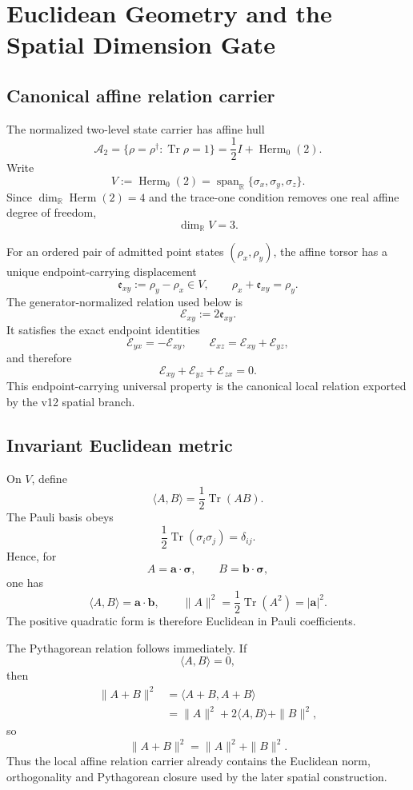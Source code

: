 \chapter{Euclidean Geometry and the Spatial Dimension Gate}
\label{ch:v12_euclidean_dimension}

\section{Canonical affine relation carrier}

The normalized two-level state carrier has affine hull
\[
\mathcal A_2
=
\{\rho=\rho^\dagger:\operatorname{Tr}\rho=1\}
=
\frac12I+\operatorname{Herm}_0(2).
\]
Write
\[
V:=\operatorname{Herm}_0(2)
=
\operatorname{span}_{\mathbb R}\{\sigma_x,\sigma_y,\sigma_z\}.
\]
Since \(\dim_{\mathbb R}\operatorname{Herm}(2)=4\) and the trace-one condition removes one
real affine degree of freedom,
\[
\boxed{\dim_{\mathbb R}V=3.}
\]

For an ordered pair of admitted point states \((\rho_x,\rho_y)\), the affine torsor
has a unique endpoint-carrying displacement
\[
\boxed{\mathfrak e_{xy}:=\rho_y-\rho_x\in V},
\qquad
\rho_x+\mathfrak e_{xy}=\rho_y.
\]
The generator-normalized relation used below is
\[
\boxed{\mathcal E_{xy}:=2\mathfrak e_{xy}.}
\]
It satisfies the exact endpoint identities
\[
\mathcal E_{yx}=-\mathcal E_{xy},
\qquad
\boxed{\mathcal E_{xz}=\mathcal E_{xy}+\mathcal E_{yz}},
\]
and therefore
\[
\mathcal E_{xy}+\mathcal E_{yz}+\mathcal E_{zx}=0.
\]
This endpoint-carrying universal property is the canonical local relation exported
by the v12 spatial branch.

\section{Invariant Euclidean metric}

On \(V\), define
\[
\boxed{
\langle A,B\rangle
=
\frac12\operatorname{Tr}(AB).
}
\]
The Pauli basis obeys
\[
\frac12\operatorname{Tr}(\sigma_i\sigma_j)=\delta_{ij}.
\]
Hence, for
\[
A=\mathbf a\cdot\boldsymbol\sigma,
\qquad
B=\mathbf b\cdot\boldsymbol\sigma,
\]
one has
\[
\boxed{
\langle A,B\rangle=\mathbf a\cdot\mathbf b,
\qquad
\|A\|^2=\frac12\operatorname{Tr}(A^2)=|\mathbf a|^2.
}
\]
The positive quadratic form is therefore Euclidean in Pauli coefficients.

The Pythagorean relation follows immediately. If
\[
\langle A,B\rangle=0,
\]
then
\[
\begin{aligned}
\|A+B\|^2
&=\langle A+B,A+B\rangle\\
&=\|A\|^2+2\langle A,B\rangle+\|B\|^2,
\end{aligned}
\]
so
\[
\boxed{\|A+B\|^2=\|A\|^2+\|B\|^2.}
\]
Thus the local affine relation carrier already contains the Euclidean norm,
orthogonality and Pythagorean closure used by the later spatial construction.

